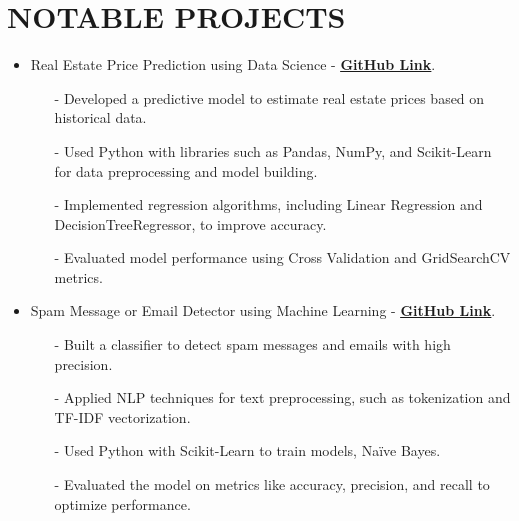 \documentclass[letterpaper,11pt]{article}
\begin{document}
\section*{\textbf{NOTABLE PROJECTS}}
\begin{itemize}[left=0cm]
    \setlength\itemsep{-0.075em} %
    \setlength\parskip{-0.075em} %
    \item Real Estate Price Prediction using Data Science - \href{https://github.com/ShahidulHaqueShaheeen/Real_Estate_Price_Prediction.git}{\underline{\textbf{GitHub Link}}}.
    \begin{itemize}[left=0cm]
        \item[-] \small \justifying Developed a predictive model to estimate real estate prices based on historical data.
        \item[-] \small  \justifying Used Python with libraries such as Pandas, NumPy, and Scikit-Learn for data preprocessing and model building.
        \item[-] \small  \justifying Implemented regression algorithms, including Linear Regression and DecisionTreeRegressor, to improve accuracy.
        \item[-] \small  \justifying Evaluated model performance using Cross Validation and GridSearchCV metrics.
    \end{itemize}
    
    \item Spam Message or Email Detector using Machine Learning - \href{https://github.com/ShahidulHaqueShaheeen/Spam_MessageOrMail_Detector.git}{\underline{\textbf{GitHub Link}}}.
    \begin{itemize}[left=0cm]
        \item[-] \small  \justifying Built a classifier to detect spam messages and emails with high precision.
        \item[-] \small \justifying Applied NLP techniques for text preprocessing, such as tokenization and TF-IDF vectorization.
        \item[-] \small \justifying Used Python with Scikit-Learn to train models, Naïve Bayes.
        \item[-] \small \justifying Evaluated the model on metrics like accuracy, precision, and recall to optimize performance.
    \end{itemize}

   
\end{itemize}
\end{document}
